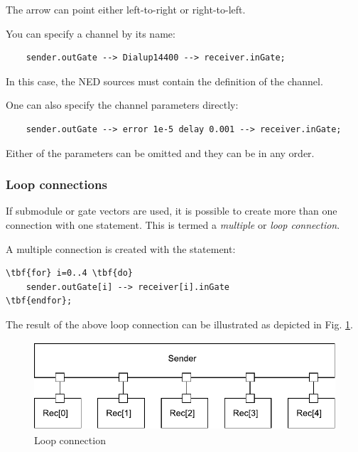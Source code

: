 The arrow can point either left-to-right or right-to-left.

You can specify a channel by its name:
\begin{verbatim}
    sender.outGate --> Dialup14400 --> receiver.inGate;
\end{verbatim}

In this case, the NED sources must contain the definition of
the channel.

One can also specify the channel parameters directly:
\begin{verbatim}
    sender.outGate --> error 1e-5 delay 0.001 --> receiver.inGate;
\end{verbatim}

Either of the parameters can be omitted and they can be in any
order.


\subsubsection{Loop connections}


If submodule or gate vectors are used, it is possible to create
more than one connection with one statement. This is termed a \textit{multiple}
or \textit{loop connection}.

A multiple connection is created with the 
statement:

\begin{Verbatim}[commandchars=\\\{\}]
\tbf{for} i=0..4 \tbf{do}
    sender.outGate[i] --> receiver[i].inGate
\tbf{endfor};
\end{Verbatim}


The result of the above loop connection can be illustrated as
depicted in Fig. \ref{fig:ch-ned-lang:loop-connection}.

\begin{figure}[htbp]
\begin{center}
\includegraphics[width=4.625in, height=1.297in]{figures/usmanFig7}
\caption{Loop connection}
\label{fig:ch-ned-lang:loop-connection}
\end{center}
\end{figure}



